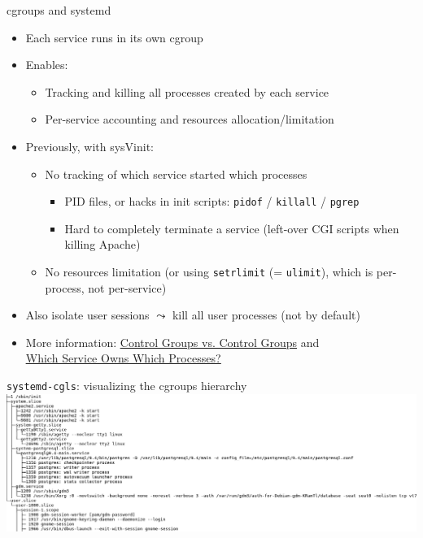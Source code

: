 \documentclass[11pt,final,usepdftitle=false]{beamer}
\begin{document}
\begin{frame}{cgroups and systemd}
	\begin{itemize}
		\item \alert{Each service runs in its own cgroup}
		\hhbr
	\item Enables:
		\begin{itemize}
			\item Tracking and killing all processes created by each service
				\hhbr
			\item Per-service accounting and resources allocation/limitation
		\end{itemize}
		\hhbr
	\item Previously, with sysVinit:
		\begin{itemize}
			\item No tracking of which service started which processes
				\begin{itemize}
					\item PID files, or hacks in init scripts: \texttt{pidof} / \texttt{killall} / \texttt{pgrep}
						\hhbr
					\item Hard to completely terminate a service (left-over CGI scripts when killing Apache)
				\end{itemize}
				\hbr
			\item No resources limitation (or using \texttt{setrlimit} (= \texttt{ulimit}), which is per-process, not per-service)
		\end{itemize}
	\hhbr
	\item \alert{Also isolate user sessions} $\leadsto$ kill all user processes (not by default)
	\hhbr
\item More information: \href{http://0pointer.net/blog/projects/cgroups-vs-cgroups.html}{\ul{Control Groups vs. Control Groups}} and\\ \href{http://0pointer.net/blog/projects/systemd-for-admins-2.html}{\ul{Which Service Owns Which Processes?}}
\end{itemize}
\end{frame}



\begin{frame}{\texttt{systemd-cgls}: visualizing the cgroups hierarchy}
\hbr
\includegraphics[height=0.9\textheight]{figs/systemd-cgls}
\end{frame}
\end{document}
